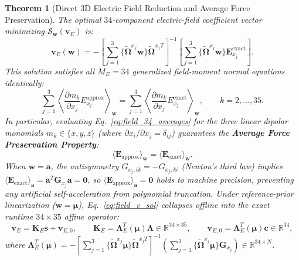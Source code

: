 \documentclass[11pt,a4paper]{article}
\newcommand{\bOmega}{\mathbf{\Omega}}
\newcommand{\bLambda}{\mathbf{\Lambda}}
\newtheorem{theorem}{Theorem}
\begin{document}
\begin{theorem}[Direct 3D Electric Field Reduction and Average Force Preservation]
\label{thm:field_reduction}
The optimal $34$-component electric-field coefficient vector minimizing $\mathcal{S}_{\bm{w}}(\bm{v}_E)$ is:
\begin{equation}
    \bm{v}_E(\bm{w}) = - \left[ \sum_{j=1}^3 \{\tilde{\bOmega}^{x_j} \bm{w}\} \tilde{\bOmega}^{x_j T} \right]^{-1} \left[ \sum_{j=1}^3 \{\tilde{\bOmega}^{x_j} \bm{w}\} \bm{E}_{x_j}^{\mathrm{exact}} \right].
    \label{eq:field_v_sol}
\end{equation}
This solution satisfies all $M_E = 34$ generalized field-moment normal equations identically:
\begin{equation}
    \sum_{j=1}^3 \left\langle \frac{\partial m_k}{\partial x_j} E_{x_j}^{\mathrm{approx}} \right\rangle_{\bm{w}} = \sum_{j=1}^3 \left\langle \frac{\partial m_k}{\partial x_j} E_{x_j}^{\mathrm{exact}} \right\rangle_{\bm{w}}, \qquad k = 2, \dots, 35.
    \label{eq:field_34_averages}
\end{equation}
In particular, evaluating Eq.~\eqref{eq:field_34_averages} for the three linear dipolar monomials $m_k \in \{x, y, z\}$ (where $\partial x_i / \partial x_j = \delta_{ij}$) guarantees the \textbf{Average Force Preservation Property}:
\begin{equation}
    \langle \bm{E}_{\mathrm{approx}} \rangle_{\bm{w}} = \langle \bm{E}_{\mathrm{exact}} \rangle_{\bm{w}}.
    \label{eq:avg_force_preservation}
\end{equation}
When $\bm{w} = \bm{a}$, the antisymmetry $G_{x_j, ik} = -G_{x_j, ki}$ (Newton's third law) implies $\langle \bm{E}_{\mathrm{exact}} \rangle_{\bm{a}} = \bm{a}^T \bm{G}_{x_j} \bm{a} = \bm{0}$, so $\langle \bm{E}_{\mathrm{approx}} \rangle_{\bm{a}} = \bm{0}$ holds to machine precision, preventing any artificial self-acceleration from polynomial truncation. Under reference-prior linearization ($\bm{w} = \bm{\mu}$), Eq.~\eqref{eq:field_v_sol} collapses offline into the exact runtime $34 \times 35$ affine operator:
\begin{equation}
    \bm{v}_E = \bm{K}_E \bm{s} + \bm{v}_{E,0}, \qquad \bm{K}_E = \bLambda_E^T(\bm{\mu}) \bLambda \in \mathbb{R}^{34 \times 35}, \qquad \bm{v}_{E,0} = \bLambda_E^T(\bm{\mu}) \bm{c} \in \mathbb{R}^{34},
    \label{eq:runtime_field_op}
\end{equation}
where $\bLambda_E^T(\bm{\mu}) = -\left[\sum_{j=1}^3 \{\tilde{\bOmega}^{x_j}\bm{\mu}\}\tilde{\bOmega}^{x_j T}\right]^{-1} \left(\sum_{j=1}^3 \{\tilde{\bOmega}^{x_j}\bm{\mu}\}\bm{G}_{x_j}\right) \in \mathbb{R}^{34 \times N}$.
\end{theorem}
\end{document}

